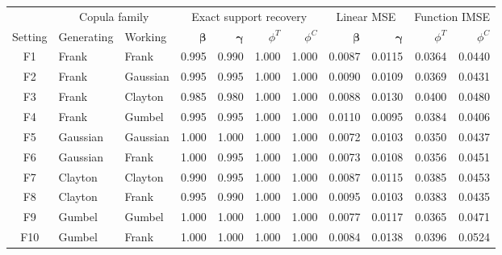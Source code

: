 \begin{table}[!htbp]
\centering

\label{tab:e10-family-sensitivity}
\begin{threeparttable}
\scriptsize
\setlength{\tabcolsep}{2.6pt}
\begin{tabular}{cllrrrrrrrr}
\toprule
& \multicolumn{2}{c}{Copula family} &
\multicolumn{4}{c}{Exact support recovery} &
\multicolumn{2}{c}{Linear MSE} &
\multicolumn{2}{c}{Function IMSE}\\
\cmidrule(lr){2-3}\cmidrule(lr){4-7}\cmidrule(lr){8-9}
\cmidrule(lr){10-11}
Setting & Generating & Working & $\boldsymbol\beta$ & $\boldsymbol\gamma$ &
$\phi^T$ & $\phi^C$ & $\boldsymbol\beta$ & $\boldsymbol\gamma$ & $\phi^T$ & $\phi^C$\\
\midrule
F1 & Frank & Frank & 0.995 & 0.990 & 1.000 & 1.000 & 0.0087 & 0.0115 & 0.0364 & 0.0440 \\
F2 & Frank & Gaussian & 0.995 & 0.995 & 1.000 & 1.000 & 0.0090 & 0.0109 & 0.0369 & 0.0431 \\
F3 & Frank & Clayton & 0.985 & 0.980 & 1.000 & 1.000 & 0.0088 & 0.0130 & 0.0400 & 0.0480 \\
F4 & Frank & Gumbel & 0.995 & 0.995 & 1.000 & 1.000 & 0.0110 & 0.0095 & 0.0384 & 0.0406 \\
F5 & Gaussian & Gaussian & 1.000 & 1.000 & 1.000 & 1.000 & 0.0072 & 0.0103 & 0.0350 & 0.0437 \\
F6 & Gaussian & Frank & 1.000 & 0.995 & 1.000 & 1.000 & 0.0073 & 0.0108 & 0.0356 & 0.0451 \\
F7 & Clayton & Clayton & 0.990 & 0.995 & 1.000 & 1.000 & 0.0087 & 0.0115 & 0.0385 & 0.0453 \\
F8 & Clayton & Frank & 0.995 & 0.990 & 1.000 & 1.000 & 0.0095 & 0.0103 & 0.0383 & 0.0435 \\
F9 & Gumbel & Gumbel & 1.000 & 1.000 & 1.000 & 1.000 & 0.0077 & 0.0117 & 0.0365 & 0.0471 \\
F10 & Gumbel & Frank & 1.000 & 1.000 & 1.000 & 1.000 & 0.0084 & 0.0138 & 0.0396 & 0.0524 \\
\bottomrule
\end{tabular}
\end{threeparttable}
\end{table}


